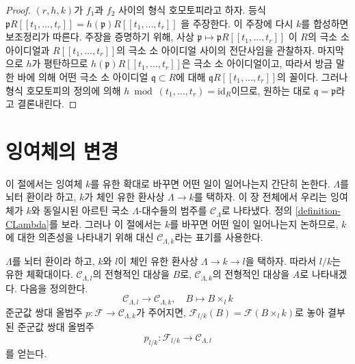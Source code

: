 \begin{proof}
$(r, h, k)$가 $f_1$과 $f_2$ 사이의 형식 호모토피라고 하자. 등식
$\mathfrak pR[[t_1, \ldots, t_r]] = h(\mathfrak p)R[[t_1, \ldots, t_r]]$
을 주장한다. 이 주장에 다시 $k$를 합성하면 보조정리가 따른다.
주장을 증명하기 위해, 사상
$\mathfrak p \mapsto \mathfrak pR[[t_1, \ldots, t_r]]$
이 $R$의 극소 소 아이디얼과 $R[[t_1, \ldots, t_r]]$의 극소 소 아이디얼
사이의 전단사임을 관찰하자. 마지막으로 $h$가 평탄하므로
$h(\mathfrak p)R[[t_1, \ldots, t_r]]$은 극소 소 아이디얼이고,
따라서 방금 말한 바에 의해 어떤 극소 소 아이디얼 $\mathfrak q \subset R$에 대해
$\mathfrak q R[[t_1, \ldots, t_r]]$의 꼴이다. 그러나 형식 호모토피의 정의에 의해
$h \bmod (t_1, \ldots, t_r) = \text{id}_R$이므로,
원하는 대로 $\mathfrak q = \mathfrak p$라고 결론내린다.
\end{proof}
\section{잉여체의 변경}
\label{section-change-of-field}

\noindent
이 절에서는 잉여체 $k$를 유한 확대로 바꾸면 어떤 일이 일어나는지 간단히 논한다.
$\Lambda$를 뇌터 환이라 하고, $k$가 체인 유한 환사상
$\Lambda \to k$를 택하자. 이 장 전체에서 우리는 잉여체가 $k$와
동일시된 아르틴 국소 $\Lambda$-대수들의 범주를
$\mathcal{C}_\Lambda$로 나타냈다. 정의 \ref{definition-CLambda}를 보라.
그러나 이 절에서는 $k$를 바꾸면 어떤 일이 일어나는지 논하므로,
$k$에 대한 의존성을 나타내기 위해 대신 $\mathcal{C}_{\Lambda, k}$라는
표기를 사용한다.

\begin{situation}
\label{situation-change-of-fields}
$\Lambda$를 뇌터 환이라 하고, $k$와 $l$이 체인 유한 환사상
$\Lambda \to k \to l$을 택하자.
따라서 $l/k$는 유한 체확대이다.
$\mathcal{C}_{\Lambda, l}$의 전형적인 대상을 $B$로,
$\mathcal{C}_{\Lambda, k}$의 전형적인 대상을 $A$로 나타내겠다. 다음을 정의한다.
\begin{equation}
\label{equation-comparison}
\mathcal{C}_{\Lambda, l} \longrightarrow \mathcal{C}_{\Lambda, k},
\quad
B \longmapsto B \times_l k
\end{equation}
준군값 쌍대 올범주
$p : \mathcal{F} \to \mathcal{C}_{\Lambda, k}$가 주어지면,
$\mathcal{F}_{l/k}(B) = \mathcal{F}(B \times_l k)$로 놓아 결부된
준군값 쌍대 올범주
$$
p_{l/k} : \mathcal{F}_{l/k} \longrightarrow \mathcal{C}_{\Lambda, l}
$$
를 얻는다.
\end{situation}

